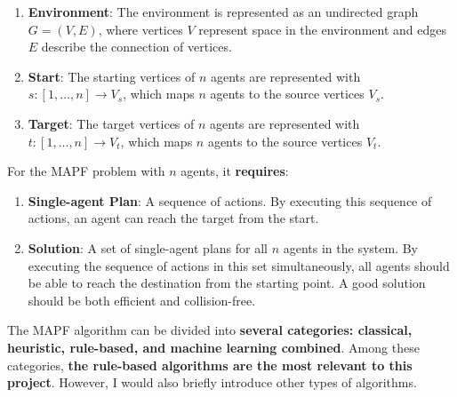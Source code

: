 \documentclass[12pt, oneside]{article}
\begin{document}
\begin{enumerate}
    \item \textbf{Environment}: The environment is represented as an undirected graph $G = (V, E)$, where vertices $V$ represent space in the environment and edges $E$ describe the connection of vertices.
    \item \textbf{Start}: The starting vertices of $n$ agents are represented with $s : [1, …, n] \rightarrow V_{s}$, which maps $n$ agents to the source vertices $V_{s}$.
    \item \textbf{Target}: The target vertices of $n$ agents are represented with $t : [1, …, n] \rightarrow V_{t}$, which maps $n$ agents to the source vertices $V_{t}$.
\end{enumerate}

For the MAPF problem with $n$ agents, it \textbf{requires}:

\begin{enumerate}
    \item \textbf{Single-agent Plan}: A sequence of actions. By executing this sequence of actions, an agent can reach the target from the start.
    \item \textbf{Solution}: A set of single-agent plans for all $n$ agents in the system. By executing the sequence of actions in this set simultaneously, all agents should be able to reach the destination from the starting point. A good solution should be both efficient and collision-free.
\end{enumerate}

The MAPF algorithm can be divided into \textbf{several categories: classical, heuristic, rule-based, and machine learning combined}. Among these categories, \textbf{the rule-based algorithms are the most relevant to this project}. However, I would also briefly introduce other types of algorithms.
\end{document}
